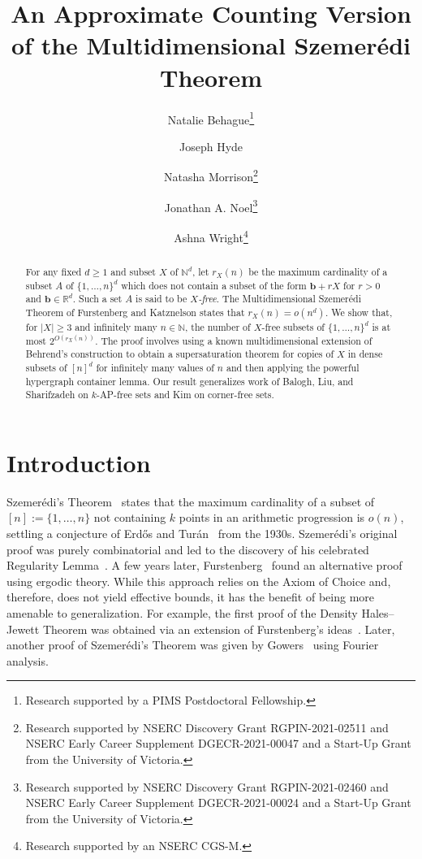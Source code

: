 \documentclass[12pt]{article}
\title{An Approximate Counting Version of the Multidimensional Szemer\'edi Theorem}
\author{Natalie Behague\thanks{Research supported by a PIMS Postdoctoral Fellowship.}}
\author{Joseph Hyde}
\author{Natasha Morrison\thanks{Research supported by NSERC Discovery Grant RGPIN-2021-02511 and NSERC Early Career Supplement DGECR-2021-00047 and a Start-Up Grant from the University of Victoria.}}
\author{Jonathan A. Noel\thanks{Research supported by NSERC Discovery Grant RGPIN-2021-02460 and NSERC Early Career Supplement DGECR-2021-00024 and a Start-Up Grant from the University of Victoria.}}
\author{Ashna Wright\thanks{Research supported by an NSERC CGS-M.}}
\affil{\normalsize{Department of Mathematics and Statistics, University of Victoria, Victoria, B.C., Canada.}}
\affil{\texttt{\{nbehague,josephhyde,nmorrison,noelj,ashnawright\}@uvic.ca}}
\numberwithin{equation}{section}
\theoremstyle{definition}
\theoremstyle{remark}
\renewcommand{\vec}{\boldsymbol}
\begin{document}
\maketitle

\begin{abstract}
For any fixed $d\geq1$ and subset $X$ of $\mathbb{N}^d$, let $r_X(n)$ be the maximum cardinality of a subset $A$ of $\{1,\dots,n\}^d$ which does not contain a subset of the form $\vec{b} + rX$ for $r>0$ and $\vec{b} \in \mathbb{R}^d$. Such a set $A$ is said to be \emph{$X$-free}. The Multidimensional Szemer\'edi Theorem of Furstenberg and Katznelson states that $r_X(n)=o(n^d)$. We show that, for $|X|\geq 3$ and infinitely many $n\in\mathbb{N}$, the number of $X$-free subsets of $\{1,\dots,n\}^d$ is at most $2^{O(r_X(n))}$. The proof involves using a known multidimensional extension of Behrend's construction to obtain a supersaturation theorem for copies of $X$ in dense subsets of $[n]^d$ for infinitely many values of $n$ and then applying the powerful hypergraph container lemma. 
Our result generalizes work of Balogh, Liu, and Sharifzadeh on $k$-AP-free sets and Kim on corner-free sets. 
\end{abstract}

\section{Introduction}

Szemer\'edi's Theorem~\cite{szemeredi} states that the maximum cardinality of a subset of $[n]:=\{1,\dots,n\}$ not containing $k$ points in an arithmetic progression is $o(n)$, settling a conjecture of Erd\H{o}s and Tur\'{a}n~\cite{erdos-conjecture} from the 1930s. Szemer\'edi's original proof was purely combinatorial and led to the discovery of his celebrated Regularity Lemma~\cite{reg-lemma}. A few years later, Furstenberg~\cite{furstenberg} found an alternative proof using ergodic theory. While this approach relies on the Axiom of Choice and, therefore, does not yield effective bounds, it has the benefit of being more amenable to generalization. For example, the first proof of the Density Hales--Jewett Theorem was obtained via an extension of Furstenberg's ideas~\cite{density-furstenberg}. Later, another proof of Szemer\'edi's Theorem was given by Gowers~\cite{gowers-fourier} using Fourier analysis. 
\end{document}
